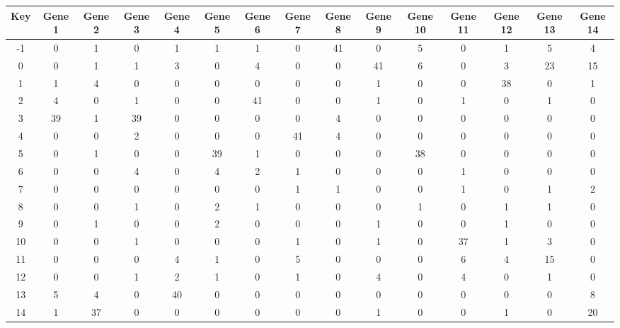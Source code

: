 \begin{tabular}{|c|c|c|c|c|c|c|c|c|c|c|c|c|c|c|}
\hline
Key & Gene 1 & Gene 2 & Gene 3 & Gene 4 & Gene 5 & Gene 6 & Gene 7 & Gene 8 & Gene 9 & Gene 10 & Gene 11 & Gene 12 & Gene 13 & Gene 14 \\
\hline
-1 & 0 & 1 & 0 & 1 & 1 & 1 & 0 & 41 & 0 & 5 & 0 & 1 & 5 & 4 \\
0 & 0 & 1 & 1 & 3 & 0 & 4 & 0 & 0 & 41 & 6 & 0 & 3 & 23 & 15 \\
1 & 1 & 4 & 0 & 0 & 0 & 0 & 0 & 0 & 1 & 0 & 0 & 38 & 0 & 1 \\
2 & 4 & 0 & 1 & 0 & 0 & 41 & 0 & 0 & 1 & 0 & 1 & 0 & 1 & 0 \\
3 & 39 & 1 & 39 & 0 & 0 & 0 & 0 & 4 & 0 & 0 & 0 & 0 & 0 & 0 \\
4 & 0 & 0 & 2 & 0 & 0 & 0 & 41 & 4 & 0 & 0 & 0 & 0 & 0 & 0 \\
5 & 0 & 1 & 0 & 0 & 39 & 1 & 0 & 0 & 0 & 38 & 0 & 0 & 0 & 0 \\
6 & 0 & 0 & 4 & 0 & 4 & 2 & 1 & 0 & 0 & 0 & 1 & 0 & 0 & 0 \\
7 & 0 & 0 & 0 & 0 & 0 & 0 & 1 & 1 & 0 & 0 & 1 & 0 & 1 & 2 \\
8 & 0 & 0 & 1 & 0 & 2 & 1 & 0 & 0 & 0 & 1 & 0 & 1 & 1 & 0 \\
9 & 0 & 1 & 0 & 0 & 2 & 0 & 0 & 0 & 1 & 0 & 0 & 1 & 0 & 0 \\
10 & 0 & 0 & 1 & 0 & 0 & 0 & 1 & 0 & 1 & 0 & 37 & 1 & 3 & 0 \\
11 & 0 & 0 & 0 & 4 & 1 & 0 & 5 & 0 & 0 & 0 & 6 & 4 & 15 & 0 \\
12 & 0 & 0 & 1 & 2 & 1 & 0 & 1 & 0 & 4 & 0 & 4 & 0 & 1 & 0 \\
13 & 5 & 4 & 0 & 40 & 0 & 0 & 0 & 0 & 0 & 0 & 0 & 0 & 0 & 8 \\
14 & 1 & 37 & 0 & 0 & 0 & 0 & 0 & 0 & 1 & 0 & 0 & 1 & 0 & 20 \\
\hline
\end{tabular}